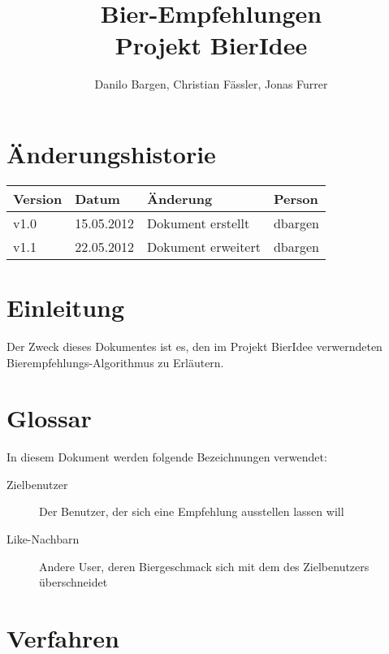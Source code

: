 \documentclass[10pt,a4paper]{scrartcl}
\author{Danilo Bargen, Christian Fässler, Jonas Furrer}
\title{Bier-Empfehlungen\\ Projekt BierIdee}
\begin{document}
\begin{titlepage}
	\maketitle
	\vspace{120mm}
	\thispagestyle{empty} %
\end{titlepage}

\tableofcontents
\newpage

\section*{Änderungshistorie}
\begin{tabular}{p{}p{}p{}p{}}
\toprule
\textbf{Version} & \textbf{Datum} & \textbf{Änderung} & \textbf{Person} \\  
\midrule
v1.0 & 15.05.2012 & Dokument erstellt & dbargen \\  
\hline
v1.1 & 22.05.2012 & Dokument erweitert & dbargen \\  
\bottomrule
\end{tabular} 
\newpage


\section{Einleitung}

Der Zweck dieses Dokumentes ist es, den im Projekt BierIdee verwerndeten Bierempfehlungs-Algorithmus zu Erläutern.


\section{Glossar}

In diesem Dokument werden folgende Bezeichnungen verwendet:

\begin{description}
	\item[Zielbenutzer] Der Benutzer, der sich eine Empfehlung ausstellen lassen will
	\item[Like-Nachbarn] Andere User, deren Biergeschmack sich mit dem des Zielbenutzers überschneidet
\end{description}


\section{Verfahren}
\end{document}
